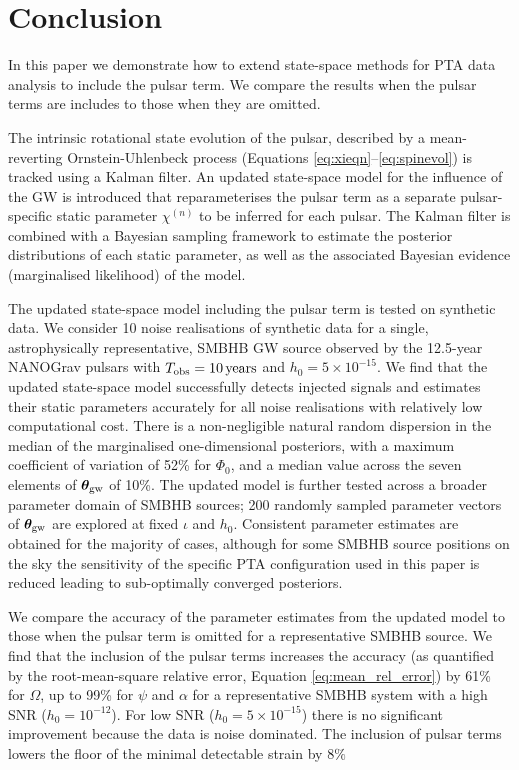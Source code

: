 \documentclass[fleqn,usenatbib,useAMS]{mnras}
\begin{document}
\section{Conclusion}\label{sec:discussion}
In this paper we demonstrate how to extend state-space methods for PTA data analysis to include the pulsar term. We compare the results when the pulsar terms are includes to those when they are omitted.  \newline 



The intrinsic rotational state evolution of the pulsar, described by a mean-reverting Ornstein-Uhlenbeck process (Equations \eqref{eq:xieqn}--\eqref{eq:spinevol}) is tracked using a Kalman filter. An updated state-space model for the influence of the GW is introduced that reparameterises the pulsar term as a separate pulsar-specific static parameter $\chi^{(n)}$ to be inferred for each pulsar. The Kalman filter is combined with a Bayesian sampling framework to estimate the posterior distributions of each static parameter, as well as the associated Bayesian evidence (marginalised likelihood) of the model. \newline 


The updated state-space model including the pulsar term is tested on synthetic data. We consider 10 noise realisations of synthetic data for a single, astrophysically representative, SMBHB GW source observed by the 12.5-year NANOGrav pulsars with $T_{\rm obs} = 10 \, {\rm years}$ and $h_0 = 5 \times 10^{-15}$. We find that the updated state-space model successfully detects injected signals and estimates their static parameters accurately for all noise realisations with relatively low computational cost. There is a non-negligible natural random dispersion in the median of the marginalised one-dimensional posteriors, with a maximum coefficient of variation of 52\% for $\Phi_0$, and a median value across the seven elements of $\boldsymbol{\theta}_{\rm gw}$ of 10\%. The updated model is further tested across a broader parameter domain of SMBHB sources; 200 randomly sampled parameter vectors of $\boldsymbol{\theta}_{\rm gw}$ are explored at fixed $\iota$ and $h_0$. Consistent parameter estimates are obtained for the majority of cases, although for some SMBHB source positions on the sky the sensitivity of the specific PTA configuration used in this paper is reduced leading to sub-optimally converged posteriors. \newline 

We compare the accuracy of the parameter estimates from the updated model to those when the pulsar term is omitted for a representative SMBHB source. We find that the inclusion of the pulsar terms increases the accuracy (as quantified by the root-mean-square relative error, Equation \eqref{eq:mean_rel_error}) by 61\% for $\Omega$, up to 99\% for $\psi$ and $\alpha$ for a representative SMBHB system with a high SNR ($h_0 = 10^{-12}$). For low SNR ($h_0 = 5 \times 10^{-15}$) there is no significant improvement because the data is noise dominated. The inclusion of pulsar terms lowers the floor of the minimal detectable strain by $8\%$ \newline  
\end{document}
